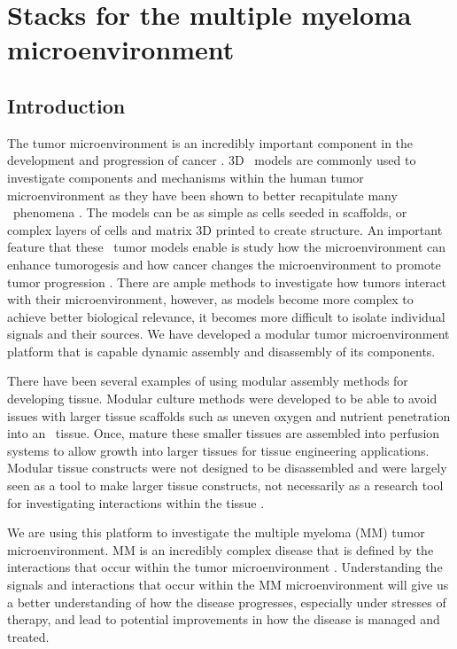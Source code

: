 \chapter{Stacks for the multiple myeloma microenvironment}
\label{App:Stacks}

\section{Introduction}

The tumor microenvironment is an incredibly important component in the development and progression of cancer \cite{Hanahan2012, Whiteside2008, Lorusso2008}. 3D \invitro\ models are commonly used to investigate components and mechanisms within the human tumor microenvironment as they have been shown to better recapitulate many \invivo\ phenomena \cite{Sung2013, Fischbach2007, Hickman2014Three-dimensionalVivo., stock2016capturing, Baker2012, Debnath2005, Wu2014, Asghar2015}. The models can be as simple as cells seeded in scaffolds, or complex layers of cells and matrix 3D printed to create structure. An important feature that these \invitro\ tumor models enable is study how the microenvironment can enhance tumorogesis and how cancer changes the microenvironment to promote tumor progression \cite{Verbridge2010, Chandler2012, Ingber2008, Polyak2009}. There are ample methods to investigate how tumors interact with their microenvironment, however, as models become more complex to achieve better biological relevance, it becomes more difficult to isolate individual signals and their sources. We have developed a modular tumor microenvironment platform that is capable dynamic assembly and disassembly of its components. 

There have been several examples of using modular assembly methods for developing tissue. Modular culture methods were developed to be able to avoid issues with larger tissue scaffolds such as uneven oxygen and nutrient penetration into an \invitro\ tissue. Once, mature these smaller tissues are assembled into perfusion systems to allow growth into larger tissues for tissue engineering applications. Modular tissue constructs were not designed to be disassembled and were largely seen as a tool to make larger tissue constructs, not necessarily as a research tool for investigating interactions within the tissue \cite{Lovett2009, Lee2012a, Bruzewicz2008, Nichol2009}.

We are using this platform to investigate the multiple myeloma (MM) tumor microenvironment. MM is an incredibly complex disease that is defined by the interactions that occur within the tumor microenvironment \cite{Mahindra2010a, Manier2012, Ribatti2006}. Understanding the signals and interactions that occur within the MM microenvironment will give us a better understanding of how the disease progresses, especially under stresses of therapy, and lead to potential improvements in how the disease is managed and treated.

